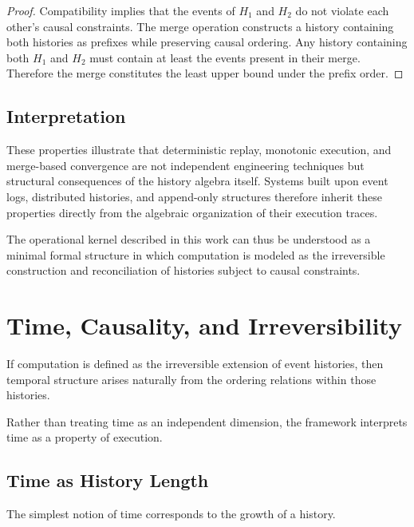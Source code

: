 \documentclass[12pt]{article}
\begin{document}
\begin{proof}
Compatibility implies that the events of $H_1$ and
$H_2$ do not violate each other's causal constraints.
The merge operation constructs a history containing
both histories as prefixes while preserving causal
ordering. Any history containing both $H_1$ and $H_2$
must contain at least the events present in their
merge. Therefore the merge constitutes the least
upper bound under the prefix order.
\end{proof}

\subsection{Interpretation}

These properties illustrate that deterministic replay,
monotonic execution, and merge-based convergence are
not independent engineering techniques but structural
consequences of the history algebra itself. Systems
built upon event logs, distributed histories, and
append-only structures therefore inherit these
properties directly from the algebraic organization
of their execution traces.

The operational kernel described in this work can
thus be understood as a minimal formal structure
in which computation is modeled as the irreversible
construction and reconciliation of histories subject
to causal constraints.


\section{Time, Causality, and Irreversibility}

If computation is defined as the irreversible extension of
event histories, then temporal structure arises naturally
from the ordering relations within those histories.

Rather than treating time as an independent dimension,
the framework interprets time as a property of execution.

\subsection{Time as History Length}

The simplest notion of time corresponds to the growth
of a history.
\end{document}
